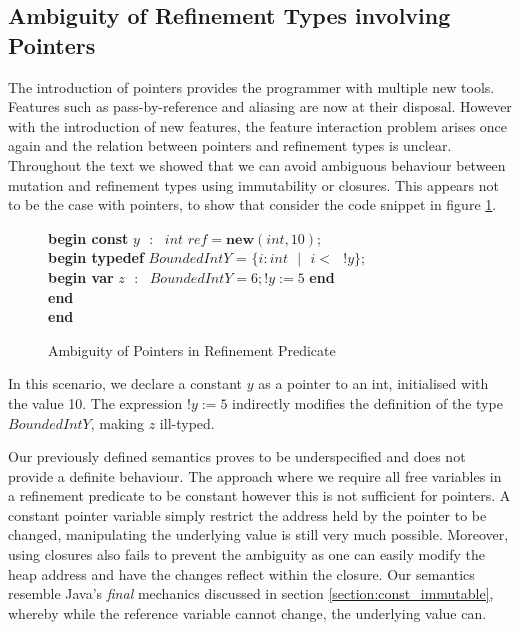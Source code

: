 \documentclass[a4paper,12pt]{report}
\newenvironment{tabs}[1]
 {\flushleft\TabPositions{#1}}
 {\endflushleft}
\begin{document}
\subsection{Ambiguity of Refinement Types involving Pointers}
The introduction of pointers provides the programmer with multiple new tools. 
Features such as pass-by-reference and aliasing are now at their disposal. 
However with the introduction of new features, the feature interaction problem 
arises once again and the relation between pointers and refinement types is 
unclear. Throughout the text we showed that we can avoid ambiguous behaviour 
between mutation and refinement types using immutability or closures. This appears 
not to be the case with pointers, to show that consider the code snippet in figure
\ref{fig:amb_refinement_pointers}. 

\begin{figure} [H]
  \begin{tabs}{1cm,2cm}
    \textbf{begin const }$y\text{ }:\text{ } int\textit{ ref} = \textbf{new}(int, 10);$\\
    \tab\textbf{begin typedef }$BoundedIntY$ = $\{i : int\text{ }|\text{ }i <\text{ }!y\}$; \\ 
    \tab\tab\textbf{begin var }$z\text{ }:\text{ }BoundedIntY = 6;!y := 5$\textbf { end} \\
    \tab\textbf {end} \\
    \textbf{end}
  \end{tabs}  
  \caption{Ambiguity of Pointers in Refinement Predicate}
  \label{fig:amb_refinement_pointers}
\end{figure}

\par
In this scenario, we declare a constant $y$ as a pointer to an int, 
initialised with the value 10. The expression $!y := 5$ indirectly modifies 
the definition of the type $BoundedIntY$, making $z$ ill-typed. 

\par
Our previously defined semantics proves to be underspecified and does not 
provide a definite behaviour. The approach where we require all free variables in a 
refinement predicate to be constant however this is not sufficient for pointers. 
A constant pointer variable simply restrict the address held by the pointer to be 
changed, manipulating the underlying value is still very much possible. 
Moreover, using closures also fails to prevent the ambiguity as one can easily 
modify the heap address and have the changes reflect within the closure. Our  
semantics resemble Java's \textit{final} mechanics discussed in section 
\ref{section:const_immutable}, whereby while the reference variable 
cannot change, the underlying value can.
\end{document}
